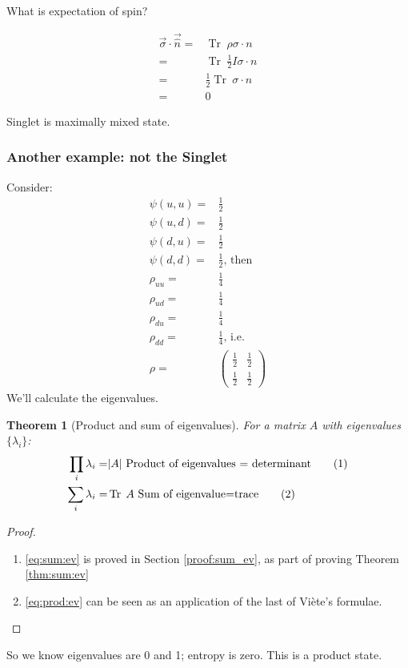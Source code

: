 \documentclass[]{article}
\newcommand\numberthis{\addtocounter{equation}{1}\tag{\theequation}}
\newtheorem{thm}{Theorem}
\DeclareMathOperator{\Tr}{Tr \;}
\begin{document}
What is expectation of spin?

\begin{align*}
	\vec{\sigma} \cdot \vec{\hat{n}} =& \Tr \rho \sigma \cdot n\\
	=& \Tr \frac{1}{2} I \sigma \cdot n\\
	=& \frac{1}{2} \Tr\sigma \cdot n\\
	=& 0
\end{align*}

Singlet is maximally mixed state.

\subsubsection{Another example: not the Singlet}
Consider:
\begin{align*}
	\psi(u,u) =& \frac{1}{2}\\
	\psi(u,d) =& \frac{1}{2}\\
	\psi(d,u) =& \frac{1}{2}\\
	\psi(d,d) =& \frac{1}{2} \text{, then}\\
	\rho_{uu} =& \frac{1}{4} \\
	\rho_{ud} =& \frac{1}{4}\\
	\rho_{du} =&  \frac{1}{4}\\
	\rho_{dd} =&  \frac{1}{4} \text{, i.e.}\\
	\rho =& \begin{pmatrix}
		\frac{1} {2}&\frac{1} {2}\\
		\frac{1} {2} &\frac{1}{2}
	\end{pmatrix}	
\end{align*}
We'll calculate the eigenvalues.
\begin{thm}[Product and sum of eigenvalues]
	For a matrix $A$ with eigenvalues  $\{\lambda_i\}$:
	\begin{align*}
		\prod_i \lambda_i =& \vert A \vert \text{ Product of eigenvalues = determinant} \numberthis \label{eq:prod:ev}\\
		\sum_i \lambda_i =& \Tr A \text{ Sum of eigenvalue=trace} \numberthis \label{eq:sum:ev}
	\end{align*}
\end{thm}
\begin{proof}
	\begin{enumerate}
		\item \eqref{eq:sum:ev} is proved in Section \ref{proof:sum_ev}, as part of proving Theorem \ref{thm:sum:ev}
		\item \eqref{eq:prod:ev} can be seen as an application of the last of Vi\`ete's  formulae\cite{enwiki:1030161470}.
	\end{enumerate}
\end{proof}
So we know eigenvalues are 0 and 1; entropy is zero. This is a product state.
\end{document}
